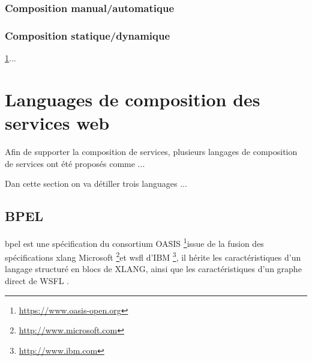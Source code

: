         \subsubsection{Composition manual/automatique}
        \label{sec:comp-manu}

        \subsubsection{Composition statique/dynamique}
        \label{sec:comp-stat}


      \ref{sec:lang-de-comp}...
      \newpage

  \section{Languages de composition des services web}
  \label{sec:lang-de-comp}
  Afin de supporter la composition de services, plusieurs langages de
  composition de services ont été proposés comme ...

  Dan cette section on va détiller trois languages ...

    \subsection{BPEL}
    \label{sec:bpel}

    \acrshort{bpel} est une spécification du consortium OASIS
    \footnote{\url{https://www.oasis-open.org}}issue de la fusion des
    spécifications \acrshort{xlang} Microsoft
    \footnote{\url{http://www.microsoft.com}}et \acrshort{wsfl} d'IBM
    \footnote{\url{http://www.ibm.com}}, il hérite les
    caractéristiques d'un langage structuré en blocs de
    \textsc{XLANG}, ainsi que les caractéristiques d'un graphe direct
    de WSFL \cite{driss2011approche}.

